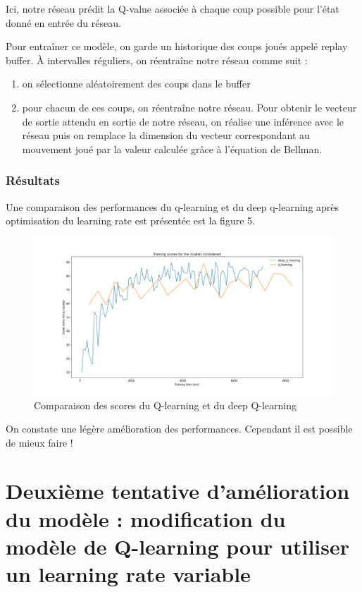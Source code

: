 \documentclass[french]{article}
\begin{document}
    Ici, notre réseau prédit la Q-value associée à chaque coup possible pour l'état donné en entrée du réseau.

    Pour entraîner ce modèle, on garde un historique des coups joués appelé replay buffer. À intervalles réguliers, on réentraîne notre réseau comme suit :
    \begin{enumerate}
        \item on sélectionne aléatoirement des coups dans le buffer
        \item pour chacun de ces coups, on réentraîne notre réseau. Pour obtenir le vecteur de sortie attendu en sortie de notre réseau, on réalise une inférence avec le réseau puis on remplace la dimension du vecteur correspondant au mouvement joué par la valeur calculée grâce à l'équation de Bellman.
    \end{enumerate}

    \subsubsection{Résultats}

    Une comparaison des performances du q-learning et du deep q-learning après optimisation du learning rate est présentée est la figure 5.
    
    \begin{figure}[h]
        \includegraphics[width=12cm]{deep_q_learning_metrics}
        \centering
        \caption{Comparaison des scores du Q-learning et du deep Q-learning}
        \centering
    \end{figure}

    On constate une légère amélioration des performances. Cependant il est possible de mieux faire !

    \section{Deuxième tentative d'amélioration du modèle : modification du modèle de Q-learning pour utiliser un learning rate variable}
\end{document}
